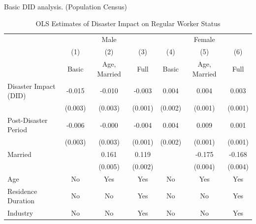 \documentclass[serif, aspectratio=169]{beamer}
\begin{document}
\begin{frame}

Basic DID analysis. (Population Census)

\begin{table}[htbp]
\centering
\caption{OLS Estimates of Disaster Impact on Regular Worker Status}

\begin{tabular}{@{}l*{6}{c}@{}}
          &\multicolumn{3}{c}{Male}                                &\multicolumn{3}{c}{Female}                              \\\cmidrule(lr){2-4}\cmidrule(lr){5-7}
          &\multicolumn{1}{c}{(1)}&\multicolumn{1}{c}{(2)}&\multicolumn{1}{c}{(3)}&\multicolumn{1}{c}{(4)}&\multicolumn{1}{c}{(5)}&\multicolumn{1}{c}{(6)}\\
          &\multicolumn{1}{c}{Basic}&\multicolumn{1}{c}{Age, Married}&\multicolumn{1}{c}{Full}&\multicolumn{1}{c}{Basic}&\multicolumn{1}{c}{Age, Married}&\multicolumn{1}{c}{Full}\\
\toprule
Disaster Impact (DID)&   -0.015\sym{***}&   -0.010\sym{***}&   -0.003\sym{**} &    0.004\sym{**} &    0.004\sym{***}&    0.003\sym{**} \\
          &  (0.003)         &  (0.003)         &  (0.001)         &  (0.002)         &  (0.001)         &  (0.001)         \\
\addlinespace
Post-Disaster Period&   -0.006\sym{**} &   -0.000         &   -0.004\sym{***}&    0.004\sym{**} &    0.009\sym{***}&    0.001         \\
          &  (0.003)         &  (0.003)         &  (0.001)         &  (0.002)         &  (0.001)         &  (0.001)         \\
\addlinespace
Married   &                  &    0.161\sym{***}&    0.119\sym{***}&                  &   -0.175\sym{***}&   -0.168\sym{***}\\
          &                  &  (0.005)         &  (0.002)         &                  &  (0.004)         &  (0.004)         \\
\midrule
Age       &       No         &      Yes         &      Yes         &       No         &      Yes         &      Yes         \\
Residence Duration&       No         &       No         &      Yes         &       No         &       No         &      Yes         \\
Industry  &       No         &       No         &      Yes         &       No         &       No         &      Yes         \\

\end{tabular}
\end{table}
\end{frame}
\end{document}
